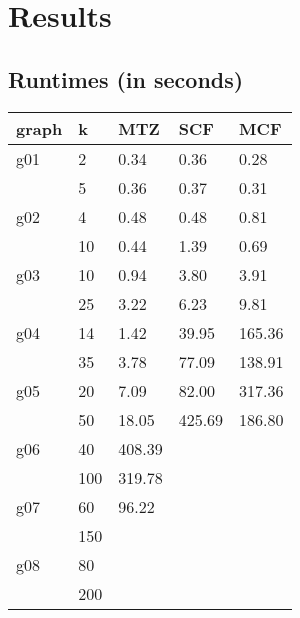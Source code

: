 
\section{Results}

\subsection{Runtimes (in seconds)}
\begin{tabular}{| l l l l l |}
\hline
graph	&	k	&	MTZ	&	SCF  	&	MCF	\\ \hline \hline
g01	&	2	&	0.34	&	0.36	&	0.28	\\
	&	5	&	0.36 	&	0.37	&	0.31	\\ \hline
g02	&	4	&	0.48	&	0.48	&	0.81	\\
	&	10	&	0.44	&	1.39	&	0.69	\\ \hline
g03	&	10	&	0.94	&	3.80	&	3.91	\\
	&	25	&	3.22	&	6.23	&	9.81	\\ \hline
g04	&	14	&	1.42	&	39.95	&	165.36	\\
	&	35	&	3.78	&	77.09	&	138.91	\\ \hline
g05	&	20	&	7.09	&	82.00	&	317.36	\\
	&	50	&	18.05	&	425.69	&	186.80	\\ \hline
g06	&	40	&	408.39	&			&		\\
	&	100	&	319.78  &			&		\\ \hline
g07	&	60	&	96.22	&			&		\\
	&	150	&			&			&		\\ \hline
g08	&	80	&			&			&		\\
	&	200	&			&			&		\\ \hline
\end{tabular}


